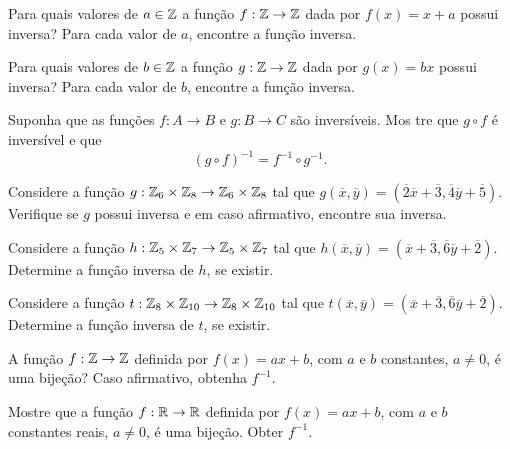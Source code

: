 \documentclass[12pt]{exam}
\begin{document}
    \questao{} Para quais valores de $a \in \mathbb{Z}$ a função $f : \mathbb{Z} \to \mathbb{Z}$ dada por $f(x)       = x + a$ possui inversa? Para cada valor de $a$, encontre a função inversa.

    \vspace{.3cm}

    \questao{} Para quais valores de $b \in \mathbb{Z}$ a função $g : \mathbb{Z} \to \mathbb{Z}$ dada por $g(x)       = bx$ possui inversa? Para cada valor de $b$, encontre a função inversa.

    \vspace{.3cm}

    \questao{} Suponha que as funções $f : A \to B$ e $g : B \to C$ são inversíveis. Mos      tre que $g \circ f$ é inversível e que
    \[
        (g \circ f)^{-1} = f^{-1} \circ g^{-1}.
    \]

    \vspace{.3cm}

    \questao{} Considere a fun{\c c}{\~a}o $g : \mathbb{Z}_6 \times \mathbb{Z}_8 \to \mathbb{Z}_6 \times \mathbb{Z}_8$ tal que $g(\overline{x},\overline{y}) = (\overline{2} \overline{x} + \overline{3}, \overline{4}\overline{y} + \overline{5})$. Verifique se $g$ possui inversa e em caso afirmativo, encontre sua inversa.

    \vspace{.3cm}

    \questao{} Considere a fun{\c c}{\~a}o $h : \mathbb{Z}_5 \times \mathbb{Z}_7 \to \mathbb{Z}_5 \times \mathbb{Z}_7$ tal que $h(\overline{x},\overline{y}) = (\overline{x} + \overline{3}, \overline{6}\overline{y} + \overline{2})$. Determine a fun\c{c}\~ao inversa de $h$, se existir.

    \vspace{.3cm}

    \questao{} Considere a fun{\c c}{\~a}o $t : \mathbb{Z}_8 \times \mathbb{Z}_{10} \to \mathbb{Z}_8 \times \mathbb{Z}_{10}$ tal que $t(\overline{x},\overline{y}) = (\overline{x} + \overline{3}, \overline{6}\overline{y} + \overline{2})$. Determine a fun\c{c}\~ao inversa de $t$, se existir.

    \vspace{.3cm}

    \questao{} A fun{\c c}{\~a}o $f : \mathbb{Z} \to \mathbb{Z}$ definida por $f(x) = ax + b$, com $a$ e $b$ constantes, $a \ne 0$, {\'e} uma bije{\c c}{\~a}o? Caso afirmativo, obtenha $f^{-1}$.

    \vspace{.3cm}


    \questao{} Mostre que a fun{\c c}{\~a}o $f : \mathbb{R} \to \mathbb{R}$ definida por $f(x) = ax + b$, com $a$ e $b$ constantes reais, $a \ne 0$, {\'e} uma bije{\c c}{\~a}o. Obter $f^{-1}$.
\end{document}
